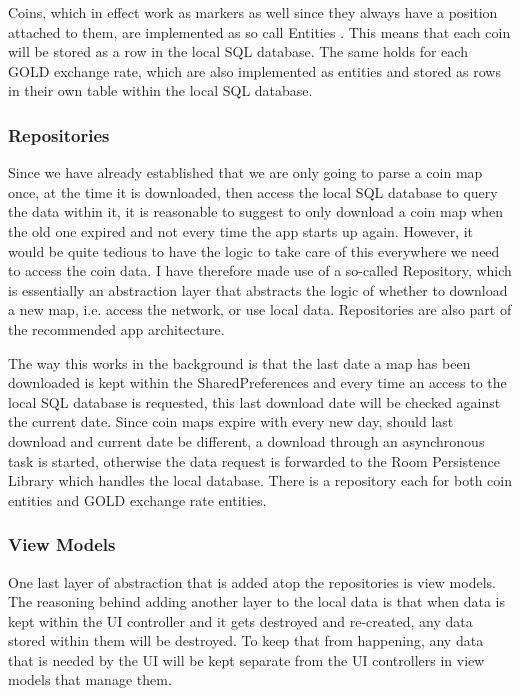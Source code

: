 \documentclass[11pt,a4paper,notitlepage]{article}
\begin{document}
    Coins, which in effect work as markers as well since they always have a position attached to them, are implemented as so call Entities \cite{room-entities}. This means that each coin will be stored as a row in the local SQL database. The same holds for each GOLD exchange rate, which are also implemented as entities and stored as rows in their own table within the local SQL database.

\subsubsection{Repositories}

    Since we have already established that we are only going to parse a coin map once, at the time it is downloaded, then access the local SQL database to query the data within it, it is reasonable to suggest to only download a coin map when the old one expired and not every time the app starts up again. However, it would be quite tedious to have the logic to take care of this everywhere we need to access the coin data. I have therefore made use of a so-called Repository, which is essentially an abstraction layer that abstracts the logic of whether to download a new map, i.e. access the network, or use local data. Repositories are also part of the recommended app architecture. \cite{app-arch-guide}

    The way this works in the background is that the last date a map has been downloaded is kept within the SharedPreferences and every time an access to the local SQL database is requested, this last download date will be checked against the current date. Since coin maps expire with every new day, should last download and current date be different, a download through an asynchronous task is started, otherwise the data request is forwarded to the Room Persistence Library which handles the local database. There is a repository each for both coin entities and GOLD exchange rate entities.

\subsubsection{View Models}

    One last layer of abstraction that is added atop the repositories is view models. \cite{view-models} The reasoning behind adding another layer to the local data is that when data is kept within the UI controller and it gets destroyed and re-created, any data stored within them will be destroyed. To keep that from happening, any data that is needed by the UI will be kept separate from the UI controllers in view models that manage them.
\end{document}
